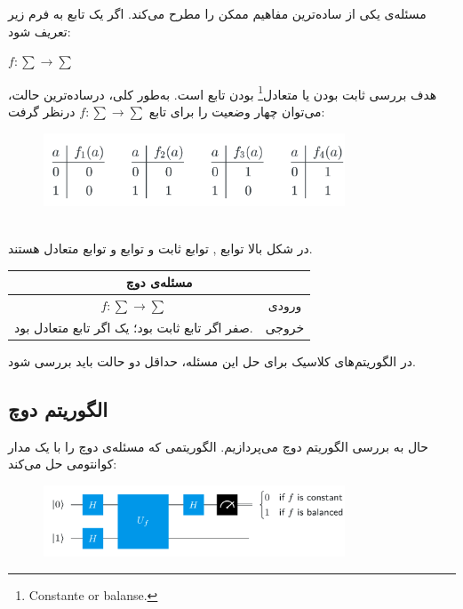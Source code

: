\documentclass{book}
\begin{document}
مسئله‌ی  یکی از ساده‌ترین مفاهیم ممکن را مطرح می‌کند. اگر یک تابع به فرم زیر تعریف شود: 
\begin{center}
	$f : \sum \rightarrow \sum$
\end{center}
هدف بررسی ثابت بودن یا متعادل\footnote{Constante or balanse.} بودن تابع  است. 
به‌طور کلی، درساده‌ترین حالت، می‌توان چهار وضعیت را برای تابع $f : \sum \rightarrow \sum$ درنظر گرفت:\\
\begin{figure}[ht]
	\centering
	\includegraphics[width=0.8\textwidth]{Constantorbalanse.png}
	\caption{}
\end{figure}\\
در شکل بالا توابع  ,  توابع ثابت و توابع  و  توابع متعادل هستند.
\begin{center}
\begin{tabular}{|c|c|}
	\hline
	\multicolumn{2}{|c|}{مسئله‌ی دوچ} \\
	\hline
	$f : \sum \rightarrow \sum$ & ورودی \\
	\hline
	صفر اگر تابع ثابت بود؛ یک اگر تابع متعادل بود.  & خروجی \\
	\hline
\end{tabular}
\end{center}
در الگوریتم‌های کلاسیک برای حل این مسئله، حداقل دو حالت باید بررسی شود.
\subsection{الگوریتم دوچ}

حال به بررسی الگوریتم دوچ می‌پردازیم. الگوریتمی که مسئله‌ی دوچ را با یک مدار کوانتومی حل می‌کند:\\
\begin{center}
\begin{figure}[ht]
	\centering
	\includegraphics[width=0.8\textwidth]{Deutsch algorithm.png}
	\caption{}
\end{figure}
\end{center}
\end{document}
